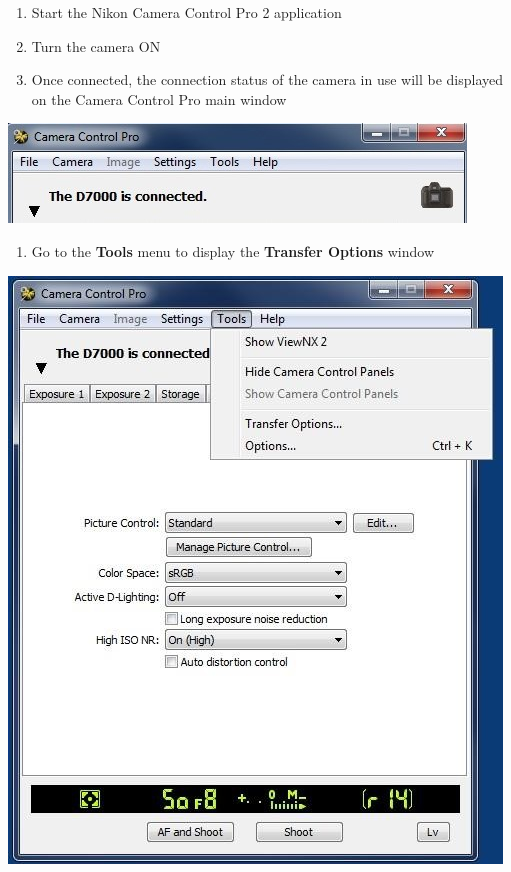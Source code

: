 \documentclass[]{book}
\providecommand{\tightlist}{%
  \setlength{\itemsep}{0pt}\setlength{\parskip}{0pt}}
\begin{document}
\begin{enumerate}
\def\labelenumi{\arabic{enumi}.}
\setcounter{enumi}{3}
\item
  Start the Nikon Camera Control Pro 2 application
\item
  Turn the camera ON
\item
  Once connected, the connection status of the camera in use will be displayed on the Camera Control Pro main window
\end{enumerate}

\includegraphics{images/Camera10.jpg}

\begin{enumerate}
\def\labelenumi{\arabic{enumi}.}
\setcounter{enumi}{6}
\tightlist
\item
  Go to the \textbf{Tools} menu to display the \textbf{Transfer Options} window
\end{enumerate}

\includegraphics{images/Camera11.jpg}
\end{document}
